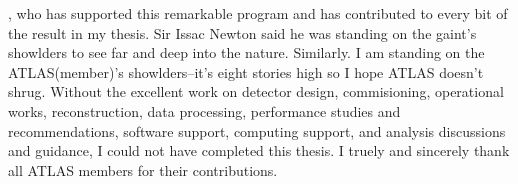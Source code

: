 




, who has supported this remarkable program and has contributed to every bit of the result in my thesis. Sir Issac Newton said he was standing on the gaint's showlders to see far and deep into the nature. Similarly. I am standing on the ATLAS(member)'s showlders--it's eight stories high so I hope ATLAS doesn't shrug. Without the excellent work on detector design, commisioning, operational works, reconstruction, data processing, performance studies and recommendations, software support, computing support, and analysis discussions and guidance, I could not have completed this thesis. I truely and sincerely thank all ATLAS members for their contributions.


